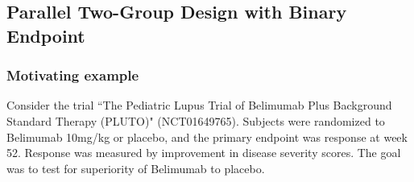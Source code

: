 \documentclass[12pt]{article}
\begin{document}

\subsection{Parallel Two-Group Design with Binary Endpoint}\label{sec:example2}
\subsubsection{Motivating example}
Consider the trial ``The Pediatric Lupus Trial of Belimumab Plus Background Standard Therapy (PLUTO)" (NCT01649765). Subjects were randomized to Belimumab 10mg/kg or placebo, and the primary endpoint was response at week 52. Response was measured by improvement in disease severity scores. The goal was to test for superiority of Belimumab to placebo. 
\end{document}
